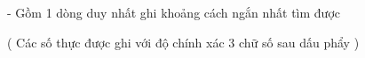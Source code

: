 - Gồm 1 dòng duy nhất ghi khoảng cách ngắn nhất tìm được  

   ( Các số thực được ghi với độ chính xác 3 chữ số sau dấu phẩy )